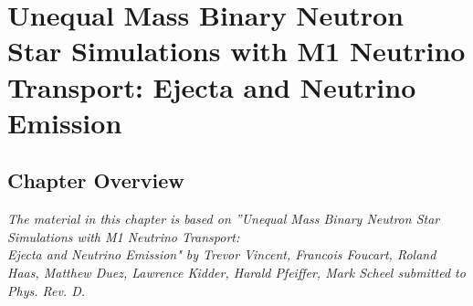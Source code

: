 \chapter{Unequal Mass Binary Neutron Star Simulations with M1 Neutrino Transport: Ejecta and Neutrino Emission}

\section{Chapter Overview}

\textit{The material in this chapter is based on ”Unequal Mass Binary Neutron Star Simulations with M1 Neutrino Transport: \\ Ejecta and Neutrino Emission" by Trevor Vincent, Francois Foucart, Roland Haas, Matthew Duez, Lawrence Kidder, Harald Pfeiffer, Mark Scheel submitted to Phys. Rev. D.}
